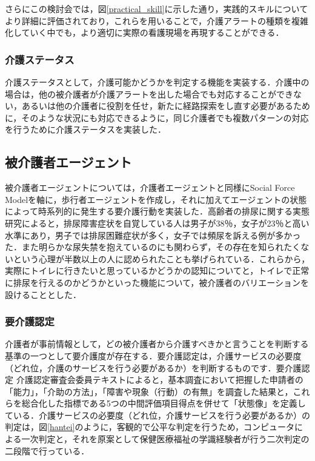 さらにこの検討会では，図\ref{practical_skill}に示した通り，実践的スキルについてより詳細に評価されており，これらを用いることで，介護アラートの種類を複雑化していく中でも，より適切に実際の看護現場を再現することができる．

\subsubsection{介護ステータス}

介護ステータスとして，介護可能かどうかを判定する機能を実装する．介護中の場合は，他の被介護者が介護アラートを出した場合でも対応することができない，あるいは他の介護者に役割を任せ，新たに経路探索をし直す必要があるために，そのような状況にも対応できるように，同じ介護者でも複数パターンの対応を行うために介護ステータスを実装した．

\subsection{被介護者エージェント}

被介護者エージェントについては，介護者エージェントと同様にSocial Force Modelを軸に，歩行者エージェントを作成し，それに加えてエージェントの状態によって時系列的に発生する要介護行動を実装した．高齢者の排尿に関する実態研究\cite{micturition}によると，排尿障害症状を自覚している人は男子が38％，女子が23％と高い水準にあり，男子では排尿困難症状が多く，女子では頻尿を訴える例が多かった．また明らかな尿失禁を抱えているのにも関わらず，その存在を知られたくないという心理が半数以上の人に認められたことも挙げられている．これらから，実際にトイレに行きたいと思っているかどうかの認知についてと，トイレで正常に排尿を行えるのかどうかといった機能について，被介護者のバリエーションを設けることとした．

\subsubsection{要介護認定}

介護者が事前情報として，どの被介護者から介護すべきかと言うことを判断する基準の一つとして要介護度が存在する．要介護認定は，介護サービスの必要度（どれ位，介護のサービスを行う必要があるか）を判断するものです．要介護認定 介護認定審査会委員テキスト\cite{youkaigodo}によると，基本調査において把握した申請者の「能力」，「介助の方法」，「障害や現象（行動）の有無」を調査した結果と，これらを総合化した指標である5つの中間評価項目得点を併せて「状態像」を定義している．介護サービスの必要度（どれ位，介護サービスを行う必要があるか）の判定は，図\ref{hantei}のように，客観的で公平な判定を行うため，コンピュータによる一次判定と，それを原案として保健医療福祉の学識経験者が行う二次判定の二段階で行っている．

